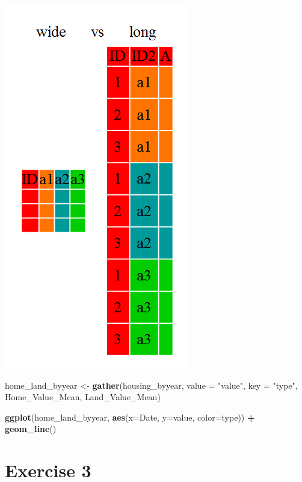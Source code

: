 \documentclass[]{book}
\newenvironment{Shaded}{\begin{snugshade}}{\end{snugshade}}
\newcommand{\DataTypeTok}[1]{\textcolor[rgb]{0.13,0.29,0.53}{#1}}
\newcommand{\KeywordTok}[1]{\textcolor[rgb]{0.13,0.29,0.53}{\textbf{#1}}}
\newcommand{\NormalTok}[1]{#1}
\newcommand{\OperatorTok}[1]{\textcolor[rgb]{0.81,0.36,0.00}{\textbf{#1}}}
\newcommand{\StringTok}[1]{\textcolor[rgb]{0.31,0.60,0.02}{#1}}
\begin{document}
\includegraphics{R/Rgraphics/images/wide_vs_long.png}

\begin{Shaded}
\begin{Highlighting}[]
\NormalTok{home_land_byyear <-}\StringTok{ }\KeywordTok{gather}\NormalTok{(housing_byyear,}
                           \DataTypeTok{value =} \StringTok{"value"}\NormalTok{,}
                           \DataTypeTok{key =} \StringTok{"type"}\NormalTok{,}
\NormalTok{                           Home_Value_Mean, Land_Value_Mean)}

\KeywordTok{ggplot}\NormalTok{(home_land_byyear, }\KeywordTok{aes}\NormalTok{(}\DataTypeTok{x=}\NormalTok{Date, }\DataTypeTok{y=}\NormalTok{value, }\DataTypeTok{color=}\NormalTok{type)) }\OperatorTok{+}
\StringTok{  }\KeywordTok{geom_line}\NormalTok{()}
\end{Highlighting}
\end{Shaded}

\hypertarget{exercise-3-2}{%
\section{Exercise 3}\label{exercise-3-2}}
\end{document}
